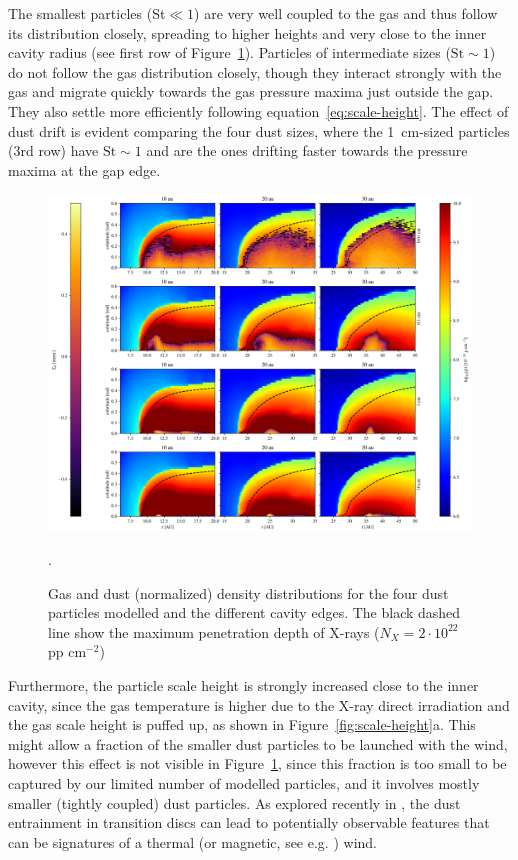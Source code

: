 \documentclass[fleqn,usenatbib]{mnras}
\begin{document}
        The smallest particles (St$\ll 1$) are very well coupled to the gas and thus follow its distribution closely, spreading to higher heights and very close to the inner cavity radius (see first row of Figure~\ref{fig:GasDustDist}).
        Particles of intermediate sizes ($\mathrm{St} \sim 1$) do not follow the gas distribution closely, though they interact strongly with the gas and migrate quickly towards the gas pressure maxima just outside the gap. 
        They also settle more efficiently following equation~\ref{eq:scale-height}.
        The effect of dust drift is evident comparing the four dust sizes, where the \SI{1}{cm}-sized particles (3rd row) have $\mathrm{St} \sim 1$ and are the ones drifting faster towards the pressure maxima at the gap edge.
        \begin{figure}
            \centering
            \includegraphics[width=\textwidth]{dens_part}
            \caption{Gas and dust (normalized) density distributions for the four dust particles modelled and the different cavity edges. The black dashed line show the maximum penetration depth of X-rays ($N_X = 2\cdot 10^{22}$ pp cm$^{-2}$)}.
            \label{fig:GasDustDist}
        \end{figure}
        
        Furthermore, the particle scale height is strongly increased close to the inner cavity, since the gas temperature is higher due to the X-ray direct irradiation and the gas scale height is puffed up, as shown in Figure~\ref{fig:scale-height}a. This might allow a fraction of the smaller dust particles to be launched with the wind, however this effect is not visible in Figure~\ref{fig:GasDustDist}, since this fraction is too small to be captured by our limited number of modelled particles, and it involves mostly smaller (tightly coupled) dust particles. As explored recently in \citet{Franz2022}, the dust entrainment in transition discs can lead to potentially observable features that can be signatures of a thermal (or magnetic, see e.g. \citet{Rodenkirch2022}) wind.
        
\end{document}
